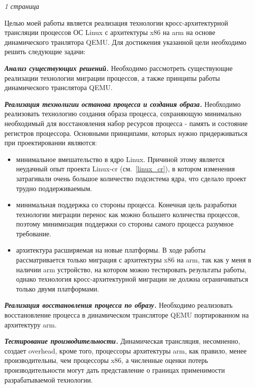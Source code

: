 \textit{1 страница}

Целью моей работы является реализация технологии кросс-архитектурной трансляции процессов ОС Linux с архитектуры x86 на arm на основе динамического транлятора QEMU. Для достижения указанной цели необходимо решить следующие задачи:

\textbf{\textit{Анализ существующих решений.}} Необходимо рассмотреть существующие реализации технологии миграции процессов, а также принципы работы динамического транслятора QEMU.

\textbf{\textit{Реализация технолигии останова процесса и создания образа.}} Необходимо реализовать технологию создания образа процесса, сохраняющую минимально необходимый для восстановления набор ресурсов процесса - память и состояние регистров процессора. Основными принципами, которых нужно придерживаться при проектировании являются:

\begin{itemize}

    \item минимальное вмешательство в ядро Linux. Причиной этому является неудачный опыт проекта Linux-cr (см.~\ref{linux_cr}), в котором изменения затрагивали очень большое количество подсистема ядра, что сделало проект трудно поддерживаемым.

    \item минимальная поддержка со стороны процесса. Конечная цель разработки технологии миграции перенос как можно большего количества процессов, поэтому минимизация поддержки со стороны самого процесса разумное требование.

    \item архитектура расширяемая на новые платформы. В ходе работы рассматривается только миграция с архитектуры x86 на arm, так как у меня в наличии arm устройство, на котором можно тестировать результаты работы, однако технология кросс-архитектурной миграции не должна ограничиваться только двумя платформами.

\end{itemize}

\textbf{\textit{Реализация восстановления процесса по образу.}} Необходимо реализовать восстановление процесса в динамическом трансляторе QEMU портированном на архитектуру arm.

\textbf{\textit{Тестирование производительности.}} Динамическая трансляция, несомненно, создает overhead, кроме того, процессоры архитектуры arm, как правило, менее производительны, чем процессоры x86, а численные оценки потерь производительности могут дать представление о границах применимости разрабатываемой технологии.

